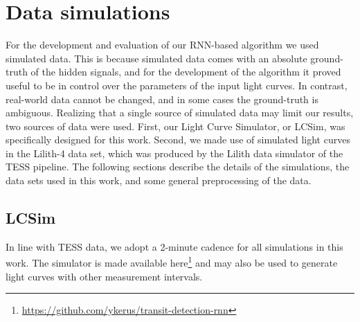 
\section{Data simulations}

For the development and evaluation of our RNN-based algorithm we used simulated data. This is because simulated data comes with an absolute ground-truth of the hidden signals, and for the development of the algorithm it proved useful to be in control over the parameters of the input light curves. In contrast, real-world data cannot be changed, and in some cases the ground-truth is ambiguous. Realizing that a single source of simulated data may limit our results, two sources of data were used. First, our Light Curve Simulator, or LCSim, was specifically designed for this work. Second, we made use of simulated light curves in the Lilith-4 data set, which was produced by the Lilith data simulator of the TESS pipeline. The following sections describe the details of the simulations, the data sets used in this work, and some general preprocessing of the data.

\subsection{LCSim}
\label{sec:lcsim}

In line with TESS data, we adopt a 2-minute cadence for all simulations in this work. The simulator is made available here\footnote{\url{https://github.com/ykerus/transit-detection-rnn}} and may also be used to generate light curves with other measurement intervals.

